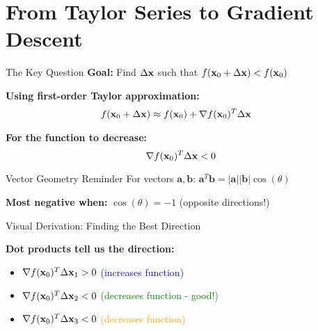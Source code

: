 \documentclass[usenames,dvipsnames]{beamer}
\begin{document}
  \section{From Taylor Series to Gradient Descent}

  \begin{frame}{The Key Question}
    \textbf{Goal:} Find $\Delta \mathbf{x}$ such that $f(\mathbf{x}_0 + \Delta \mathbf{x}) < f(\mathbf{x}_0)$
    
    \pause
    \textbf{Using first-order Taylor approximation:}
    \begin{align}
        f(\mathbf{x}_0 + \Delta \mathbf{x}) &\approx f(\mathbf{x}_0) + \nabla f(\mathbf{x}_0)^T \Delta \mathbf{x}
    \end{align}
    
    \pause
    \textbf{For the function to decrease:}
    $$\nabla f(\mathbf{x}_0)^T \Delta \mathbf{x} < 0$$
    
    \pause
    \begin{alertbox}{Vector Geometry Reminder}
    For vectors $\mathbf{a}, \mathbf{b}$: $\mathbf{a}^T\mathbf{b} = |\mathbf{a}||\mathbf{b}|\cos(\theta)$
    
    \textbf{Most negative when:} $\cos(\theta) = -1$ (opposite directions!)
    \end{alertbox}
  \end{frame}

  \begin{frame}{Visual Derivation: Finding the Best Direction}
    \begin{center}
    \end{center}
    
    \pause
    \textbf{Dot products tell us the direction:}
    \begin{itemize}
        \item $\nabla f(\mathbf{x}_0)^T \Delta \mathbf{x}_1 > 0$ \textcolor{blue}{(increases function)}
        \item $\nabla f(\mathbf{x}_0)^T \Delta \mathbf{x}_2 < 0$ \textcolor{green}{(decreases function - good!)}
        \item $\nabla f(\mathbf{x}_0)^T \Delta \mathbf{x}_3 < 0$ \textcolor{orange}{(decreases function)}
    \end{itemize}
    
  \end{frame}
\end{document}
